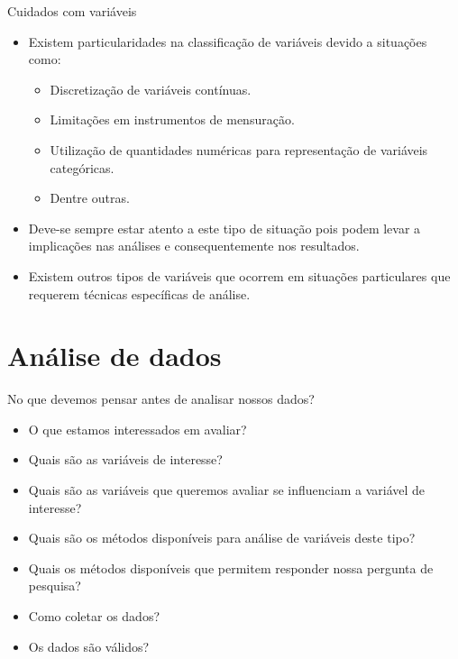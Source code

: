 \documentclass[
  ignorenonframetext,
  serif,
  professionalfont,
  usenames,
  dvipsnames,
  aspectratio = 169]{beamer}
\providecommand{\tightlist}{%
  \setlength{\itemsep}{0pt}\setlength{\parskip}{0pt}}
\renewcommand{\tightlist}{%
  \setlength{\itemsep}{0\baselineskip}
  \setlength{\parskip}{0.25\baselineskip}
}
\begin{document}
\begin{frame}{Cuidados com variáveis}
\label{cuidados-com-variuxe1veis}
\begin{itemize}
\tightlist
\item
  Existem particularidades na classificação de variáveis devido a
  situações como:

  \begin{itemize}
  \tightlist
  \item
    Discretização de variáveis contínuas.
  \item
    Limitações em instrumentos de mensuração.
  \item
    Utilização de quantidades numéricas para representação de variáveis
    categóricas.
  \item
    Dentre outras.
  \end{itemize}
\end{itemize}

\vspace{0.3cm}

\begin{itemize}
\item
  Deve-se sempre estar atento a este tipo de situação pois podem levar a
  implicações nas análises e consequentemente nos resultados.
\item
  Existem outros tipos de variáveis que ocorrem em situações
  particulares que requerem técnicas específicas de análise.
\end{itemize}
\end{frame}

\section{Análise de dados}\label{anuxe1lise-de-dados}

\begin{frame}{No que devemos pensar antes de analisar nossos dados?}
\label{no-que-devemos-pensar-antes-de-analisar-nossos-dados}
\begin{itemize}
\tightlist
\item
  O que estamos interessados em avaliar?
\item
  Quais são as variáveis de interesse?
\item
  Quais são as variáveis que queremos avaliar se influenciam a variável
  de interesse?
\item
  Quais são os métodos disponíveis para análise de variáveis deste tipo?
\item
  Quais os métodos disponíveis que permitem responder nossa pergunta de
  pesquisa?
\item
  Como coletar os dados?
\item
  Os dados são válidos?
\end{itemize}
\end{frame}
\end{document}
